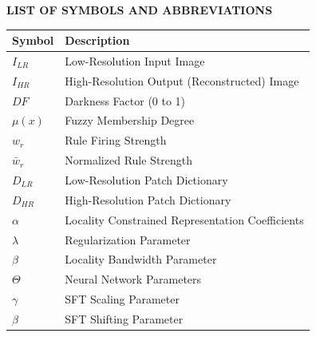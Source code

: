 \begin{center}
    \large
    \textbf{LIST OF SYMBOLS AND ABBREVIATIONS}
\end{center}

\vspace{1cm}

\begin{table}[h]
    \centering
    \begin{tabular}{ll}
        \textbf{Symbol} & \textbf{Description} \\
        \midrule
        $I_{LR}$ & Low-Resolution Input Image \\
        $I_{HR}$ & High-Resolution Output (Reconstructed) Image \\
        $DF$ & Darkness Factor (0 to 1) \\
        $\mu(x)$ & Fuzzy Membership Degree \\
        $w_r$ & Rule Firing Strength \\
        $\bar{w}_r$ & Normalized Rule Strength \\
        $D_{LR}$ & Low-Resolution Patch Dictionary \\
        $D_{HR}$ & High-Resolution Patch Dictionary \\
        $\alpha$ & Locality Constrained Representation Coefficients \\
        $\lambda$ & Regularization Parameter \\
        $\beta$ & Locality Bandwidth Parameter \\
        $\Theta$ & Neural Network Parameters \\
        $\gamma$ & SFT Scaling Parameter \\
        $\beta$ & SFT Shifting Parameter \\
        \bottomrule
    \end{tabular}
\end{table}

\vspace{1cm}

